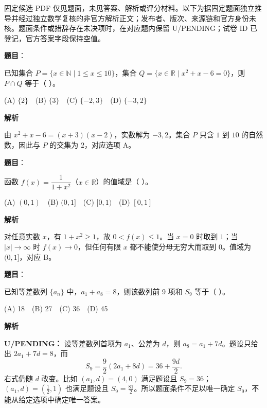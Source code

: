 

\begin{gktip}
固定候选 PDF 仅见题面，未见答案、解析或评分材料。以下为据固定题面独立推导并经过独立数学复核的非官方解析正文；发布者、版次、来源链和官方身份未核。题面条件或措辞存在未决项时，在对应题内保留 U/PENDING；试卷 ID 已登记，官方答案字段保持空值。
\end{gktip}

\begin{answer}

\textbf{题目}：

已知集合 \(P=\{x\in\mathbb N\mid 1\le x\le10\}\)，集合 \(Q=\{x\in\mathbb R\mid x^2+x-6=0\}\)，则 \(P\cap Q\) 等于（ ）。

(A) \(\{2\}\)　(B) \(\{3\}\)　(C) \(\{-2,3\}\)　(D) \(\{-3,2\}\)

\textbf{解析}

由 $x^2+x-6=(x+3)(x-2)$，实数解为 $-3,2$。集合 $P$ 只含 $1$ 到 $10$ 的自然数，因此与 $P$ 的交集为 ${2}$，对应选项 A。


\end{answer}
\begin{answer}

\textbf{题目}：

函数 \(f(x)=\dfrac{1}{1+x^2}\)（\(x\in\mathbb R\)）的值域是（ ）。

(A) \((0,1)\)　(B) \((0,1]\)　(C) \([0,1)\)　(D) \([0,1]\)

\textbf{解析}

对任意实数 $x$，有 $1+x^2\ge1$，故 $0<f(x)\le1$。当 $x=0$ 时取到 $1$；当 $|x|\to\infty$ 时 $f(x)\to0$，但任何有限 $x$ 都不能使分母无穷大而取到 $0$。值域为 $(0,1]$，对应 B。

\gkanswer{答案：B，(0,1]。}

\end{answer}
\begin{answer}

\textbf{题目}：

已知等差数列 \(\{a_n\}\) 中，\(a_1+a_8=8\)，则该数列前 9 项和 \(S_9\) 等于（ ）。

(A) 18　(B) 27　(C) 36　(D) 45

\textbf{解析}

\textbf{U/PENDING：} 设等差数列首项为 $a_1$、公差为 $d$，则 $a_8=a_1+7d$。题设只给出 $2a_1+7d=8$，而
\nopagebreak[4]
\[
S_9=\frac{9}{2}(2a_1+8d)=36+\frac{9d}{2}.
\]
右式仍随 $d$ 改变。比如 $(a_1,d)=(4,0)$ 满足题设且 $S_9=36$；$(a_1,d)=(\tfrac12,1)$ 也满足题设且 $S_9=\tfrac{81}{2}$。所以题面条件不足以唯一确定 $S_9$，不能从给定选项中确定唯一答案。


\end{answer}
